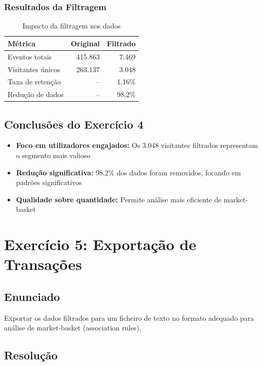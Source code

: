\documentclass[11pt,a4paper]{article}
\begin{document}
\subsubsection{Resultados da Filtragem}

\begin{table}[H]
\centering
\begin{tabular}{@{}lrr@{}}
\toprule
\textbf{Métrica} & \textbf{Original} & \textbf{Filtrado} \\ \midrule
Eventos totais & 415.863 & 7.469 \\
Visitantes únicos & 263.137 & 3.048 \\
Taxa de retenção & -- & 1,16\% \\
Redução de dados & -- & 98,2\% \\ \bottomrule
\end{tabular}
\caption{Impacto da filtragem nos dados}
\label{tab:filtering}
\end{table}

\subsection{Conclusões do Exercício 4}

\begin{itemize}
    \item \textbf{Foco em utilizadores engajados:} Os 3.048 visitantes filtrados representam o segmento mais valioso
    \item \textbf{Redução significativa:} 98,2\% dos dados foram removidos, focando em padrões significativos
    \item \textbf{Qualidade sobre quantidade:} Permite análise mais eficiente de market-basket
\end{itemize}

\newpage

\section{Exercício 5: Exportação de Transações}

\subsection{Enunciado}

Exportar os dados filtrados para um ficheiro de texto no formato adequado para análise de market-basket (association rules).

\subsection{Resolução}
\end{document}
